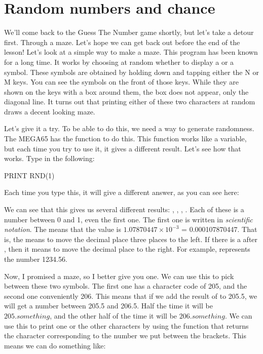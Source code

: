 \section{Random numbers and chance}

We'll come back to the Guess The Number game shortly, but let's take a
detour first. Through a maze. Let's hope we can get back out before
the end of the lesson!  Let's look at a simple way to make a
maze. This program has been known for a long time.  It works by
choosing at random whether to display a {} or a
{} symbol.  These symbols are obtained by holding down
 and tapping either the N or M keys.  You
can see the symbols on the front of those keys.  While they are shown
on the keys with a box around them, the box does not appear, only the
diagonal line.  It turns out that printing either of these two
characters at random draws a decent looking maze.

\needspace{4cm}
Let's give it a try.  To be able to do this, we need a way to generate
randomness.  The MEGA65 has the  function to do this.  This
function works like a variable, but each time you try to use it, it
gives a different result.  Let's see how that works.  Type in the
following:

\begin{screenoutput}
PRINT RND(1)
\end{screenoutput}

Each time you type this, it will give a different answer, as you can
see here:


We can see that this gives us several different results: ,
, , .  Each of these is
a number between 0 and 1, even the first one.  The first one is
written in {\em scientific notation}.  The
 means that the value is $1.07870447\times10^{-3}$ =
0.000107870447.  That is, the  means to move the decimal
place three places to the left. If there is a \stw{+} after ,
then it means to move the decimal place to the right. For example,
 represents the number 1234.56.

\needspace{3cm}
Now, I promised a maze, so I better give you one. We can use this
 to pick between these two symbols.  The first one has a
character code of 205, and the second one conveniently 206.  This
means that if we add the result of  to 205.5, we will get
a number between 205.5 and 206.5.  Half the time it will be
$205.something$, and the other half of the time it will be $206.something$.
We can use this to print one or the other characters by using the
 function that returns the character corresponding to the
number we put between the brackets.  This means we can do something
like:

